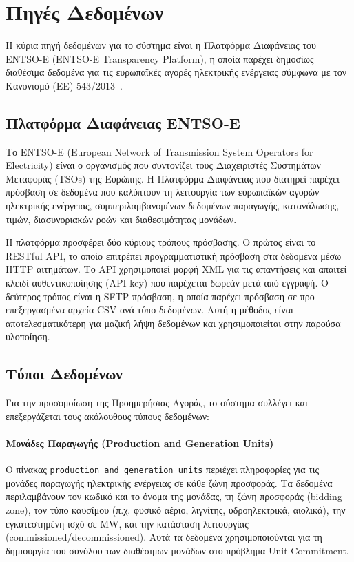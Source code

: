 \section{Πηγές Δεδομένων}
\label{sec:data-sources}

Η κύρια πηγή δεδομένων για το σύστημα είναι η Πλατφόρμα Διαφάνειας του ENTSO-E (ENTSO-E Transparency Platform), η οποία παρέχει δημοσίως διαθέσιμα δεδομένα για τις ευρωπαϊκές αγορές ηλεκτρικής ενέργειας σύμφωνα με τον Κανονισμό (ΕΕ) 543/2013~\cite{entsoe-transparency, eu-regulation-543}.

\subsection{Πλατφόρμα Διαφάνειας ENTSO-E}
\label{subsec:entsoe-platform}

Το ENTSO-E (European Network of Transmission System Operators for Electricity) είναι ο οργανισμός που συντονίζει τους Διαχειριστές Συστημάτων Μεταφοράς (TSOs) της Ευρώπης. Η Πλατφόρμα Διαφάνειας που διατηρεί παρέχει πρόσβαση σε δεδομένα που καλύπτουν τη λειτουργία των ευρωπαϊκών αγορών ηλεκτρικής ενέργειας, συμπεριλαμβανομένων δεδομένων παραγωγής, κατανάλωσης, τιμών, διασυνοριακών ροών και διαθεσιμότητας μονάδων.

Η πλατφόρμα προσφέρει δύο κύριους τρόπους πρόσβασης. Ο πρώτος είναι το RESTful API, το οποίο επιτρέπει προγραμματιστική πρόσβαση στα δεδομένα μέσω HTTP αιτημάτων. Το API χρησιμοποιεί μορφή XML για τις απαντήσεις και απαιτεί κλειδί αυθεντικοποίησης (API key) που παρέχεται δωρεάν μετά από εγγραφή. Ο δεύτερος τρόπος είναι η SFTP πρόσβαση, η οποία παρέχει πρόσβαση σε προ-επεξεργασμένα αρχεία CSV ανά τύπο δεδομένων. Αυτή η μέθοδος είναι αποτελεσματικότερη για μαζική λήψη δεδομένων και χρησιμοποιείται στην παρούσα υλοποίηση.

\subsection{Τύποι Δεδομένων}
\label{subsec:data-types}

Για την προσομοίωση της Προημερήσιας Αγοράς, το σύστημα συλλέγει και επεξεργάζεται τους ακόλουθους τύπους δεδομένων:

\paragraph{Μονάδες Παραγωγής (Production and Generation Units)}
Ο πίνακας \texttt{production\_and\_generation\_units} περιέχει πληροφορίες για τις μονάδες παραγωγής ηλεκτρικής ενέργειας σε κάθε ζώνη προσφοράς. Τα δεδομένα περιλαμβάνουν τον κωδικό και το όνομα της μονάδας, τη ζώνη προσφοράς (bidding zone), τον τύπο καυσίμου (π.χ. φυσικό αέριο, λιγνίτης, υδροηλεκτρικά, αιολικά), την εγκατεστημένη ισχύ σε MW, και την κατάσταση λειτουργίας (commissioned/decommissioned). Αυτά τα δεδομένα χρησιμοποιούνται για τη δημιουργία του συνόλου των διαθέσιμων μονάδων στο πρόβλημα Unit Commitment.

